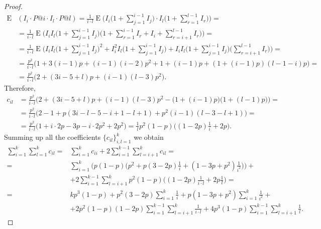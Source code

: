 \documentclass{tpms-l}
\theoremstyle{definition}
\theoremstyle{remark}
\numberwithin{equation}{section}
\begin{document}
\begin{proof}
\begin{equation*}
\begin{split}
\operatorname{E}&(I_i \cdot P@i \cdot I_l \cdot P@l) = \frac{1}{i\cdot l} \operatorname{E}\Big( I_i \Big(1+\sum_{j=1}^{i-1} I_j\Big) \cdot I_l \Big(1+\sum_{r=1}^{l-1} I_r\Big) \Big) =
\\
&= \frac{1}{i\cdot l} \operatorname{E}\Big( I_i I_l \Big(1+\sum_{j=1}^{i-1} I_j\Big) \Big(1+\sum_{r=1}^{i-1} I_r + I_i + \sum_{r=i+1}^{l-1} I_r\Big) \Big) =
\\
& = \frac{1}{i\cdot l} \operatorname{E}\Big( I_i I_l \Big(1+\sum_{j=1}^{i-1} I_j\Big)^2 + I_i^2 I_l \Big(1+\sum_{j=1}^{i-1} I_j\Big) + I_i I_l \Big(1 + \sum_{j=1}^{i-1} I_j\Big) \Big(\sum_{r=i+1}^{l-1} I_r\Big) \Big) =
\\
&= \frac{p^2}{i\cdot l} \Big( 1+3(i-1)p+(i-1)(i-2)p^2 + 1+(i-1)p +  (1+(i-1)p)(l-1-i)p \Big) =
\\
& = \frac{p^2}{i\cdot l} \Big( 2+(3i-5+l)p + (i-1)(l-3)p^2  \Big).
\end{split}
\end{equation*}
Therefore, 
\begin{equation*}
\begin{split}
c_{il} & = \frac{p^2}{i\cdot l} \Big( 2+(3i-5+l)p + (i-1)(l-3)p^2   -  \Big(1+(i-1)p\Big)\Big(1+(l-1)p\Big)\Big) =
\\
&= \frac{p^2}{i\cdot l}  \Big( 2 - 1 + p(3i-l-5-i+1-l+1) + p^2(i-1)(l-3-l+1) \Big) =
\\
&= \frac{p^2}{i\cdot l}  \Big( 1 + i \cdot 2p - 3p - i \cdot 2p^2 + 2p^2 \Big)
=  \frac{1}{l} p^2(1-p) \Big( (1-2p)\frac{1}{i} + 2p \Big).
\end{split}
\end{equation*}
Summing up all the coefficients $\{c_{il}\}_{i,l=1}^k$ we obtain
\begin{equation*}
\begin{split}
\sum_{i=1}^{k}  \sum_{l=1}^{k}  c_{il} = &  \sum_{i=1}^{k} c_{ii} + 2\sum_{i=1}^{k-1} \sum_{l=i+1}^{k} c_{il} =
\\
= & \sum_{i=1}^{k} \Bigg( p(1-p) \Big( p^2 + p (3-2p) \frac{1}{i} + (1-3p+p^2) \frac{1}{i^2} \Big) \Bigg) +
\\
&+ 2\sum_{i=1}^{k-1} \sum_{l=i+1}^{k} p^2(1-p) \Bigg( (1-2p) \frac{1}{i\cdot l} + 2p \frac{1}{l} \Bigg) =
\\
= & k p^3(1-p) + p^2(3-2p) \sum_{i=1}^{k} \frac{1}{i} + p(1-3p+p^2) \sum_{i=1}^{k} \frac{1}{i^2} +
\\
&+ 2p^2(1-p)(1-2p) \sum_{i=1}^{k-1} \sum_{l=i+1}^{k} \frac{1}{i\cdot l} + 4p^3(1-p) \sum_{i=1}^{k-1} \sum_{l=i+1}^{k} \frac{1}{l}.
\end{split}
\end{equation*}


\end{proof}
\end{document}

